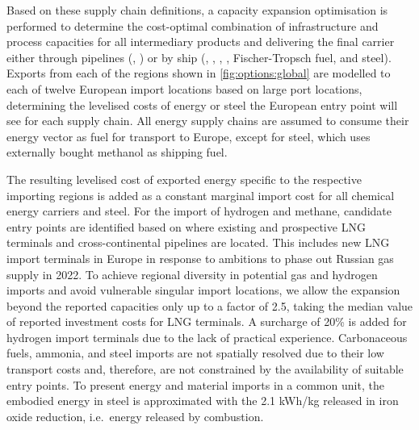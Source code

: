 \documentclass[5p,10pt]{elsarticle}
\begin{document}

Based on these supply chain definitions, a capacity expansion optimisation is
performed to determine the cost-optimal combination of infrastructure and
process capacities for all intermediary products and delivering the final
carrier either through pipelines (, ) or by ship
(, , , , Fischer-Tropsch fuel,
and steel). Exports from each of the regions shown in \cref{fig:options:global}
are modelled to each of twelve European import locations based on large port
locations, determining the levelised costs of energy or steel the European entry
point will see for each supply chain. All energy supply chains are assumed to
consume their energy vector as fuel for transport to Europe, except for steel,
which uses externally bought methanol as shipping fuel.


The resulting levelised cost of exported energy specific to the respective
importing regions is added as a constant marginal import cost for all
chemical energy carriers and steel. For the import of hydrogen and methane,
candidate entry points are identified based on where existing and prospective
LNG terminals and cross-continental pipelines are located. This includes new LNG
import terminals in Europe in response to ambitions to phase out Russian gas
supply in 2022.
\cite{instituteforenergyeconomicsandfinancialanalysisEuropeanLNG2023} To achieve
regional diversity in potential gas and hydrogen imports and avoid vulnerable
singular import locations, we allow the expansion beyond the reported capacities
only up to a factor of 2.5, taking the median value of reported investment costs
for LNG terminals.\cite{GlobalGas2022} A surcharge of 20\% is added for hydrogen
import terminals due to the lack of practical experience. Carbonaceous fuels,
ammonia, and steel imports are not spatially resolved due to their low transport
costs and, therefore, are not constrained by the availability of suitable entry
points. To present energy and material imports in a common unit, the embodied
energy in steel is approximated with the 2.1 kWh/kg released in iron oxide
reduction, i.e.~energy released by combustion.\cite{kuhnIronRecyclable2022}

\end{document}
